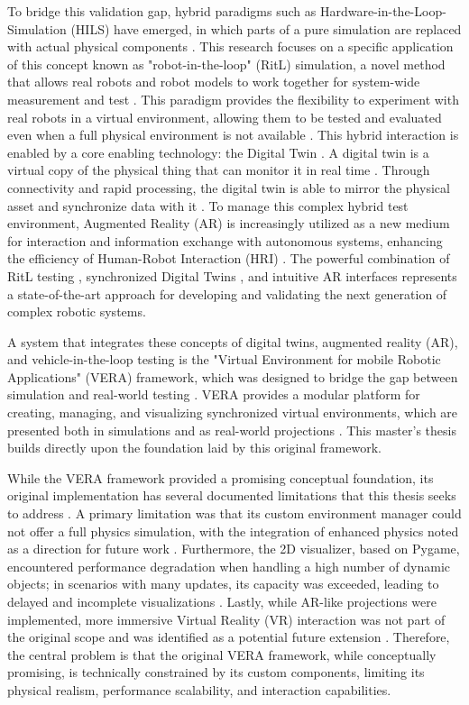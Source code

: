 To bridge this validation gap, hybrid paradigms such as Hardware-in-the-Loop-Simulation (HILS) have emerged, in which parts of a pure simulation are replaced with actual physical components \cite{Hu05}. This research focuses on a specific application of this concept known as "robot-in-the-loop" (RitL) simulation, a novel method that allows real robots and robot models to work together for system-wide measurement and test \cite{Hu05}. This paradigm provides the flexibility to experiment with real robots in a virtual environment, allowing them to be tested and evaluated even when a full physical environment is not available \cite{Hu05}. This hybrid interaction is enabled by a core enabling technology: the Digital Twin \cite{AA23}. A digital twin is a virtual copy of the physical thing that can monitor it in real time \cite{AA23}. Through connectivity and rapid processing, the digital twin is able to mirror the physical asset and synchronize data with it \cite{AA23}. To manage this complex hybrid test environment, Augmented Reality (AR) is increasingly utilized as a new medium for interaction and information exchange with autonomous systems, enhancing the efficiency of Human-Robot Interaction (HRI) \cite{MV20}. The powerful combination of RitL testing \cite{Hu05}, synchronized Digital Twins \cite{AA23}, and intuitive AR interfaces \cite{MV20} represents a state-of-the-art approach for developing and validating the next generation of complex robotic systems.

A system that integrates these concepts of digital twins, augmented reality (AR), and vehicle-in-the-loop testing is the "Virtual Environment for mobile Robotic Applications" (VERA) framework, which was designed to bridge the gap between simulation and real-world testing \cite{Geh24}. VERA provides a modular platform for creating, managing, and visualizing synchronized virtual environments, which are presented both in simulations and as real-world projections \cite{Geh24}. This master's thesis builds directly upon the foundation laid by this original framework.

While the VERA framework provided a promising conceptual foundation, its original implementation has several documented limitations that this thesis seeks to address \cite{Geh24}. A primary limitation was that its custom environment manager could not offer a full physics simulation, with the integration of enhanced physics noted as a direction for future work \cite{Geh24}. Furthermore, the 2D visualizer, based on Pygame, encountered performance degradation when handling a high number of dynamic objects; in scenarios with many updates, its capacity was exceeded, leading to delayed and incomplete visualizations \cite{Geh24}. Lastly, while AR-like projections were implemented, more immersive Virtual Reality (VR) interaction was not part of the original scope and was identified as a potential future extension \cite{Geh24}. Therefore, the central problem is that the original VERA framework, while conceptually promising, is technically constrained by its custom components, limiting its physical realism, performance scalability, and interaction capabilities.

